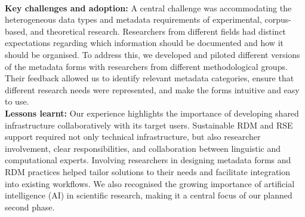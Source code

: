 \documentclass{eceasst}
\begin{document}
\\
\textbf{Key challenges and adoption:} A central challenge was accommodating the heterogeneous data types and metadata requirements of experimental, corpus-based, and theoretical research. Researchers from different fields had distinct expectations regarding which information should be documented and how it should be organised. To address this, we developed and piloted different versions of the metadata forms with researchers from different methodological groups. Their feedback allowed us to identify relevant metadata categories, ensure that different research needs were represented, and make the forms intuitive and easy to use.
\\
\textbf{Lessons learnt:} Our experience highlights the importance of developing shared infrastructure collaboratively with its target users. Sustainable RDM and RSE support required not only technical infrastructure, but also researcher involvement, clear responsibilities, and collaboration between linguistic and computational experts.
Involving researchers in designing metadata forms and RDM practices helped tailor solutions to their needs and facilitate integration into existing workflows.
We also recognised the growing importance of artificial intelligence (AI) in scientific research, making it a central focus of our planned second phase.

\end{document}
